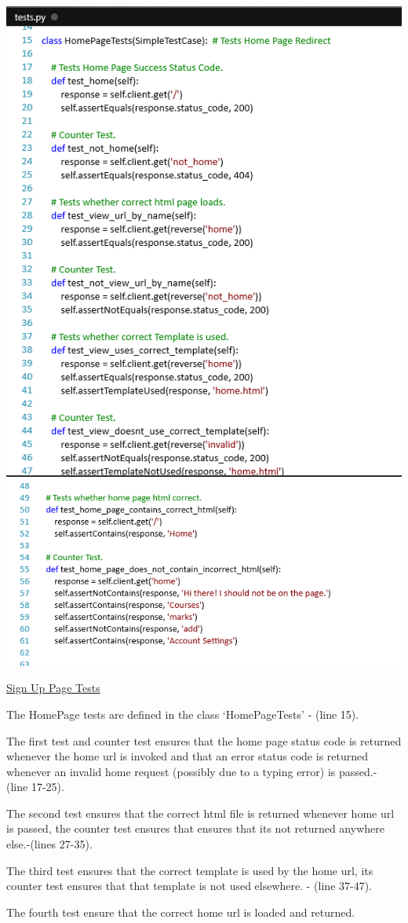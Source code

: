 \documentclass[10pt]{article}
\begin{document}
\begin{center}
\includegraphics[width=.8\textwidth]{sign_test1.png}
\includegraphics[width=.8\textwidth]{sign_test2.png}
\end{center}
\caption{\underline{Sign Up Page Tests}}

\begin{description}[font=$\bullet$~\normalfont\scshape\color{red!50!black}]

\item [] The HomePage tests are defined in the class ‘HomePageTests’ - (line 15).
\item [] The first test and counter test ensures that the home page status code is returned whenever the home url is invoked and that an error status  code is returned whenever an invalid home request (possibly due to a typing error) is passed.- (line 17-25).
\item [] The second test ensures that the correct html file is returned whenever home url is passed, the counter test ensures that ensures that its not returned anywhere else.-(lines 27-35).
\item [] The third test ensures that the correct template is used by the home url, its counter test ensures that that template is not used elsewhere. - (line 37-47).
\item [] The fourth test ensure that the correct home url is loaded and returned.

\end{description}
\end{document}
